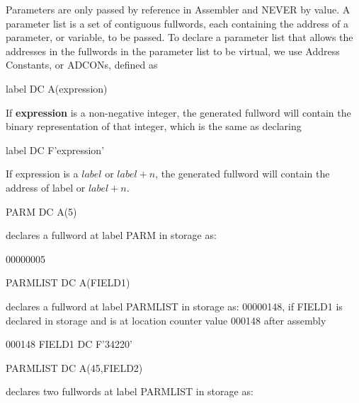 \documentclass{report}
\begin{document}
\begin{itemize}
            Parameters are only passed by reference in Assembler and NEVER by value.
            \bigbreak \noindent 
            A parameter list is a set of contiguous fullwords, each containing the address of a parameter, or variable, to be passed.
            \bigbreak \noindent 
            To declare a parameter list that allows the addresses in the fullwords in the parameter list to be virtual, we use Address Constants, or ADCONs, defined as
            \bigbreak \noindent 
            \begin{cppcode}
            label DC A(expression)
            \end{cppcode}
            \bigbreak \noindent 
            If \textbf{expression} is a non-negative integer, the generated fullword will contain the binary representation of that integer, which is the same as declaring
            \bigbreak \noindent 
            \begin{cppcode}
            label DC F'expression'
            \end{cppcode}
            \bigbreak \noindent 
            If expression is a $label$ or $label+n$, the generated fullword will contain the address of label or $label+n$.
            \bigbreak \noindent 
            \begin{cppcode}
            PARM DC A(5)
            \end{cppcode}
            \bigbreak \noindent 
            declares a fullword at label PARM in storage as:
            \bigbreak \noindent 
            \begin{center}
                00000005
            \end{center}
            \bigbreak \noindent 
            \begin{cppcode}
            PARMLIST DC A(FIELD1)
            \end{cppcode}
            \bigbreak \noindent 
            declares a fullword at label PARMLIST in storage as: 00000148, if FIELD1 is declared in storage and is at location counter value 000148 after assembly
            \bigbreak \noindent 
            \begin{cppcode}
            000148 FIELD1 DC F'34220'
            \end{cppcode}
            \bigbreak \noindent 
            \begin{cppcode}
            PARMLIST DC A(45,FIELD2)
            \end{cppcode}
            declares two fullwords at label PARMLIST in storage as:
            \bigbreak \noindent 

\end{itemize}
\end{document}
